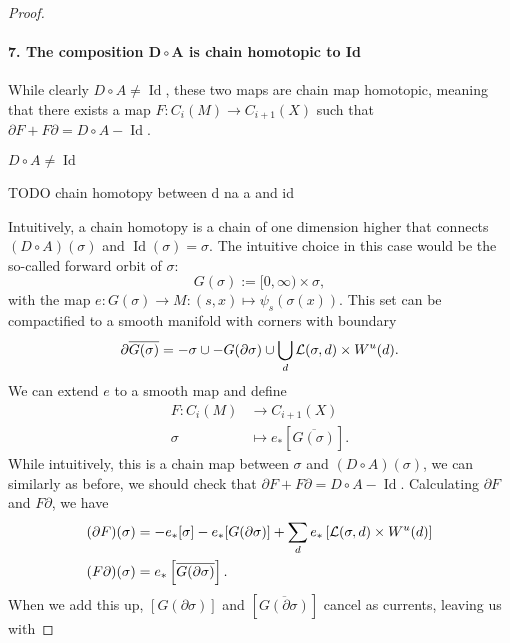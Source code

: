 \begin{proof}
\paragraph{7. The composition $\bm{D  \circ A}$ is chain homotopic to Id}
While clearly $D  \circ  A \neq \operatorname{Id}$, these two maps are chain map homotopic, meaning that there exists a map $F: C_i(M) \to  C_{i+1}(X)$ such that $\partial F + F \partial = D  \circ  A - \operatorname{Id}$.
\begin{marginfigure}
    \centering
    \caption{$D  \circ  A \neq  \operatorname{Id}$}
    \label{fig:d-na-a-is-not-identity}
\end{marginfigure}
\begin{marginfigure}
    \centering
    \caption{TODO chain homotopy between d na a and id}
    \label{fig:chain-homotopy-between-d-na-a-and-id}
\end{marginfigure}
Intuitively, a chain homotopy is a chain of one dimension higher that connects $(D  \circ  A)(\sigma)$ and $\operatorname{Id} (\sigma) = \sigma$.
The intuitive choice in this case would be the so-called forward orbit of $\sigma$:
\[
    G(\sigma) := [0, \infty) \times \sigma
,\] with the map $e: G(\sigma) \to  M: (s, x) \mapsto \psi_s (\sigma(x))$.
This set can be compactified to a smooth manifold with corners with boundary
\[
    \partial \overline{G(\sigma)} = - \sigma \cup - G(\partial \sigma) \cup \bigcup_{d}  \mathcal L(\sigma, d) \times W^u(d)
.\] 
We can extend $e$ to a smooth map and define 
\begin{align*}
    F: C_i(M) &\longrightarrow C_{i+1}(X) \\
    \sigma &\longmapsto e_* \left[ \overline{G(\sigma)} \right] 
.\end{align*}
While intuitively, this is a chain map between $\sigma$ and  $(D  \circ A)(\sigma)$, we can similarly as before, we should check that $\partial F + F \partial = D  \circ  A - \operatorname{Id}$.
Calculating $\partial F$ and  $F \partial$, we have
\begin{align*}
    (\partial F)(\sigma) &= -e_*[\sigma] - e_*[G(\partial \sigma)] + \sum_{d} e_*\left[\mathcal L(\sigma, d) \times W^u(d)\right]\\
    (F \partial)(\sigma) &= e_*\left[\overline{G(\partial \sigma)}\right]
    .\end{align*}
    When we add this up, $[G (\partial \sigma)]$ and $\left[ \overline{G(\partial \sigma)} \right]$ cancel as currents, leaving us with


\end{proof}
